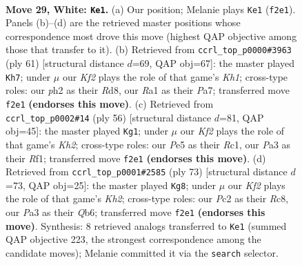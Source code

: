 \documentclass[11pt]{article}
\begin{document}
\clearpage

\begin{figure}[p]\centering
\begin{subfigure}{0.46\textwidth}\centering
\resizebox{\linewidth}{!}{%
\newchessgame
\chessboard[
  setfen={1Qb2k2/4n3/2q5/4Pp2/p7/P7/2P2Krp/R6R w - - 0 29},
  showmover=false,
  pgfstyle=straightmove, color=movearrow, markmove={f2-e1}
]}
\caption{}
\end{subfigure}\hfill
\begin{subfigure}{0.46\textwidth}\centering
\resizebox{\linewidth}{!}{%
\newchessgame
\chessboard[
  setfen={3r3k/pp3pB1/2p4p/5q1N/7P/1P1r4/PQ4PK/R7 b - - 0 31},
  showmover=false,
  pgfstyle=straightmove, color=movearrow, markmove={h8-h7}
]}
\caption{}
\end{subfigure}
\\[4pt]
\begin{subfigure}{0.46\textwidth}\centering
\resizebox{\linewidth}{!}{%
\newchessgame
\chessboard[
  setfen={2k2b2/2n2pp1/2Q5/3rp3/3P4/6P1/4q2K/2R2R2 w - - 3 29},
  showmover=false,
  pgfstyle=straightmove, color=movearrow, markmove={h2-g1}
]}
\caption{}
\end{subfigure}\hfill
\begin{subfigure}{0.46\textwidth}\centering
\resizebox{\linewidth}{!}{%
\newchessgame
\chessboard[
  setfen={r1r5/5p1k/1q2p3/8/7Q/p4P2/1P2N1PP/1K1N3R b - - 9 37},
  showmover=false,
  pgfstyle=straightmove, color=movearrow, markmove={h7-g8}
]}
\caption{}
\end{subfigure}
\caption{\textbf{Move 29, White: \texttt{Ke1}.} (a) Our position; Melanie plays \texttt{Ke1} (\texttt{f2e1}). Panels (b)--(d) are the retrieved master positions whose correspondence most drove this move (highest QAP objective among those that transfer to it). (b) Retrieved from \texttt{ccrl\_top\_p0000\#3963} (ply 61) [structural distance $d$=69, QAP obj=67]: the master played \texttt{Kh7}; under $\mu$ our \emph{Kf2} plays the role of that game's \emph{Kh1}; cross-type roles: our \emph{p}h2 as their \emph{R}d8, our \emph{R}a1 as their \emph{P}a7; transferred move \texttt{f2e1} \textbf{(endorses this move)}. (c) Retrieved from \texttt{ccrl\_top\_p0002\#14} (ply 56) [structural distance $d$=81, QAP obj=45]: the master played \texttt{Kg1}; under $\mu$ our \emph{Kf2} plays the role of that game's \emph{Kh2}; cross-type roles: our \emph{P}e5 as their \emph{R}c1, our \emph{P}a3 as their \emph{R}f1; transferred move \texttt{f2e1} \textbf{(endorses this move)}. (d) Retrieved from \texttt{ccrl\_top\_p0001\#2585} (ply 73) [structural distance $d$=73, QAP obj=25]: the master played \texttt{Kg8}; under $\mu$ our \emph{Kf2} plays the role of that game's \emph{Kh2}; cross-type roles: our \emph{P}c2 as their \emph{R}c8, our \emph{P}a3 as their \emph{Q}b6; transferred move \texttt{f2e1} \textbf{(endorses this move)}. Synthesis: 8 retrieved analogs transferred to \texttt{Ke1} (summed QAP objective 223, the strongest correspondence among the candidate moves); Melanie committed it via the \texttt{search} selector.}
\label{fig:thought-m56}
\end{figure}
\end{document}
